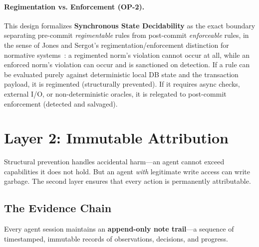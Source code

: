 \documentclass[11pt,a4paper]{article}
\theoremstyle{definition}
\theoremstyle{remark}
\begin{document}
\paragraph{Regimentation vs. Enforcement (OP-2).}
This design formalizes \textbf{Synchronous State Decidability} as the exact boundary separating pre-commit \emph{regimentable} rules from post-commit \emph{enforceable} rules, in the sense of Jones and Sergot's regimentation/enforcement distinction for normative systems~\cite{jonessergot1993regimentation}: a regimented norm's violation cannot occur at all, while an enforced norm's violation can occur and is sanctioned on detection. If a rule can be evaluated purely against deterministic local DB state and the transaction payload, it is regimented (structurally prevented). If it requires async checks, external I/O, or non-deterministic oracles, it is relegated to post-commit enforcement (detected and salvaged).

\section{Layer 2: Immutable Attribution}\label{sec:attribution}

Structural prevention handles accidental harm---an agent cannot exceed capabilities it does not hold. But an agent \emph{with} legitimate write access can write garbage. The second layer ensures that every action is permanently attributable.

\subsection{The Evidence Chain}

Every agent session maintains an \textbf{append-only note trail}---a sequence of timestamped, immutable records of observations, decisions, and progress.
\end{document}
